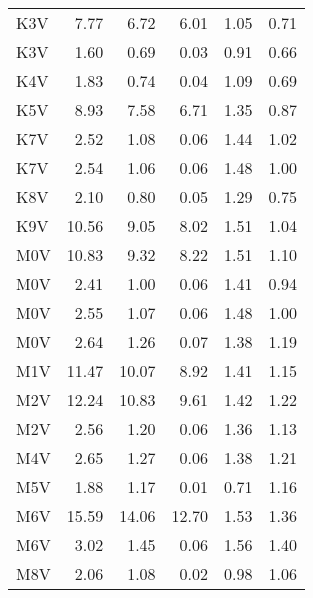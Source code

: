 \begin{tabular}{lrrrrr}
 K3V &  7.77 &  6.72 &  6.01 &  1.05 &  0.71 \\
 K3V &  1.60 &  0.69 &  0.03 &  0.91 &  0.66 \\
 K4V &  1.83 &  0.74 &  0.04 &  1.09 &  0.69 \\
 K5V &  8.93 &  7.58 &  6.71 &  1.35 &  0.87 \\
 K7V &  2.52 &  1.08 &  0.06 &  1.44 &  1.02 \\
 K7V &  2.54 &  1.06 &  0.06 &  1.48 &  1.00 \\
 K8V &  2.10 &  0.80 &  0.05 &  1.29 &  0.75 \\
 K9V & 10.56 &  9.05 &  8.02 &  1.51 &  1.04 \\
 M0V & 10.83 &  9.32 &  8.22 &  1.51 &  1.10 \\
 M0V &  2.41 &  1.00 &  0.06 &  1.41 &  0.94 \\
 M0V &  2.55 &  1.07 &  0.06 &  1.48 &  1.00 \\
 M0V &  2.64 &  1.26 &  0.07 &  1.38 &  1.19 \\
 M1V & 11.47 & 10.07 &  8.92 &  1.41 &  1.15 \\
 M2V & 12.24 & 10.83 &  9.61 &  1.42 &  1.22 \\
 M2V &  2.56 &  1.20 &  0.06 &  1.36 &  1.13 \\
 M4V &  2.65 &  1.27 &  0.06 &  1.38 &  1.21 \\
 M5V &  1.88 &  1.17 &  0.01 &  0.71 &  1.16 \\
 M6V & 15.59 & 14.06 & 12.70 &  1.53 &  1.36 \\
 M6V &  3.02 &  1.45 &  0.06 &  1.56 &  1.40 \\
 M8V &  2.06 &  1.08 &  0.02 &  0.98 &  1.06 \\
\bottomrule
\end{tabular}
